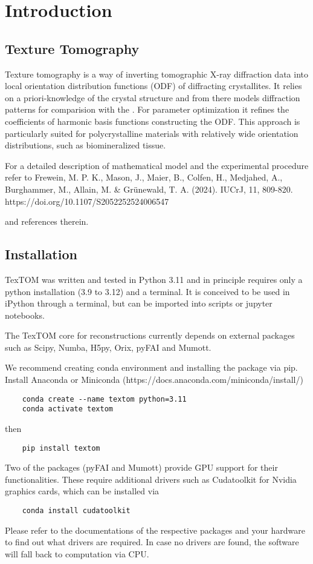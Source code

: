 \section{Introduction}

\subsection{Texture Tomography}
Texture tomography is a way of inverting tomographic X-ray diffraction data into local
orientation distribution functions (ODF) of diffracting crystallites.
It relies on a priori-knowledge of the crystal structure and from there
models diffraction patterns for comparision with the . For parameter optimization it refines
the coefficients of harmonic basis functions constructing the ODF.
This approach is particularly suited for polycrystalline materials
with relatively wide orientation distributions, such as biomineralized tissue.

For a detailed description of mathematical model and the experimental procedure
refer to 
Frewein, M. P. K., Mason, J., Maier, B., Colfen, H., Medjahed, A., Burghammer, 
M., Allain, M. \& Grünewald, T. A. (2024). IUCrJ, 11, 809-820. https://doi.org/10.1107/S2052252524006547

and references therein.

\subsection{Installation}

TexTOM was written and tested in Python 3.11 and in principle requires only a python installation (3.9 to 3.12) and a terminal.
It is conceived to be used in iPython through a terminal, but can be imported into scripts or jupyter notebooks.

The TexTOM core for reconstructions currently depends on external packages such as Scipy, Numba, H5py, Orix, pyFAI and Mumott.

We recommend creating conda environment and installing the package via pip.
Install Anaconda or Miniconda (https://docs.anaconda.com/miniconda/install/) 
\begin{verbatim}
    conda create --name textom python=3.11
    conda activate textom
\end{verbatim}
then
\begin{verbatim}
    pip install textom
\end{verbatim}

Two of the packages (pyFAI and Mumott) provide GPU support for their functionalities.
These require additional drivers such as Cudatoolkit for Nvidia graphics cards, which
can be installed via 
\begin{verbatim}
    conda install cudatoolkit
\end{verbatim}
Please refer to the documentations of the respective packages and your hardware
to find out what drivers are required.
In case no drivers are found, the software will fall back to computation via CPU.

